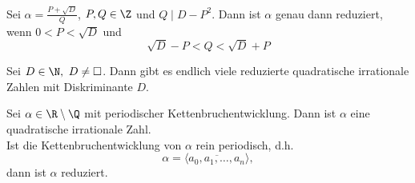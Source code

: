 \begin{thm}\autolabel
	Sei $\alpha = \frac{P + \sqrt{D}}{Q}$, $P,Q \in \Z$ und $Q \mid D - P^2$. Dann ist $\alpha$ genau dann reduziert, wenn $0 < P < \sqrt{D}$ und
	\[ \sqrt{D} - P < Q < \sqrt{D} + P \]
\end{thm}

\begin{cor*}
	Sei $D \in \N,\ D \neq \square$. Dann gibt es endlich viele reduzierte quadratische irrationale Zahlen mit Diskriminante $D$.
\end{cor*}

\begin{thm}\autolabel
	Sei $\alpha \in \R \setminus \Q$ mit periodischer Kettenbruchentwicklung. Dann ist $\alpha$ eine quadratische irrationale Zahl.\\
	Ist die Kettenbruchentwicklung von $\alpha$ rein periodisch, d.h.
	\[ \alpha = \langle \overbar{a_0,a_1,\dotsc,a_n}\rangle, \]
	dann ist $\alpha$ reduziert.
\end{thm}